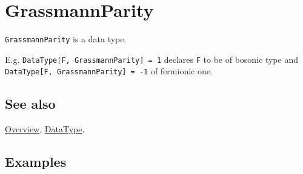 \documentclass[../FeynCalcManual.tex]{subfiles}
\begin{document}
\hypertarget{grassmannparity}{
\section{GrassmannParity}\label{grassmannparity}}

\texttt{GrassmannParity} is a data type.

E.g.
\texttt{DataType[\allowbreak{}F,\ \allowbreak{}GrassmannParity] = 1}
declares \texttt{F} to be of bosonic type and
\texttt{DataType[\allowbreak{}F,\ \allowbreak{}GrassmannParity] = -1} of
fermionic one.

\subsection{See also}

\hyperlink{toc}{Overview}, \hyperlink{datatype}{DataType}.

\subsection{Examples}
\end{document}
